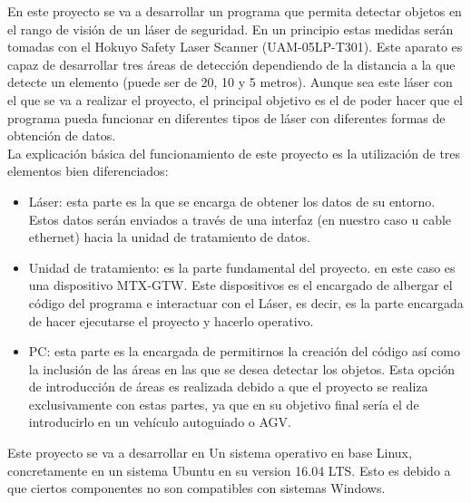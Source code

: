 
En este proyecto se va a desarrollar un programa que permita detectar objetos en el rango de visión de un láser de seguridad. En un principio estas medidas serán tomadas con el Hokuyo Safety Laser Scanner (UAM-05LP-T301). Este aparato es capaz de desarrollar tres áreas de detección dependiendo de la distancia a la que detecte un elemento (puede ser de 20, 10 y 5 metros). Aunque sea este láser con el que se va a realizar el proyecto, el principal objetivo es el de poder hacer que el programa pueda funcionar en diferentes tipos de láser con diferentes formas de obtención de datos.\\
La explicación básica del funcionamiento de este proyecto es la utilización de tres elementos bien diferenciados:
\begin{itemize}
    \item Láser: esta parte es la que se encarga de obtener los datos de su entorno. Estos datos serán enviados a través de una interfaz (en nuestro caso u cable ethernet) hacia la unidad de tratamiento de datos.
    \item Unidad de tratamiento: es la parte fundamental del  proyecto. en este caso es una dispositivo MTX‐GTW. Este dispositivos es el encargado de albergar el código del programa e interactuar con el Láser, es decir, es la parte encargada de hacer ejecutarse el proyecto y hacerlo operativo.
    \item PC: esta parte es la encargada de permitirnos la creación del código así como la inclusión de las áreas en las que se desea detectar los objetos. Esta opción de introducción de áreas es realizada debido a que el proyecto se realiza exclusivamente con estas partes, ya que en su objetivo final sería el de introducirlo en un vehículo autoguiado o AGV.\\
\end{itemize}
Este proyecto se va a desarrollar en Un sistema operativo en base Linux, concretamente en un sistema Ubuntu en su version 16.04 LTS. Esto es debido a que ciertos componentes no son compatibles con sistemas  Windows.